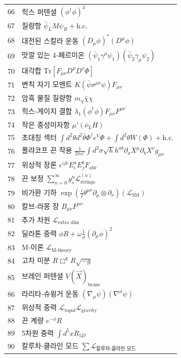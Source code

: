 \documentclass[11pt,a4paper]{article}
\begin{document}
\begin{longtable}{r l}
		66 & 힉스 퍼텐셜 $(\phi^\dagger\phi)^3$ \\
		67 & 질량항 $\bar{\psi}_L M \psi_R + \text{h.c.}$ \\
		68 & 대전된 스칼라 운동 $(D_\mu\phi)^*(D^\mu\phi)$ \\
		69 & 맛깔 있는 4‑페르미온 $(\bar{\psi}_1\gamma^\mu\psi_1)(\bar{\psi}_2\gamma_\mu\psi_2)$ \\
		70 & 대각합 $\mathrm{Tr}[F_{\mu\nu}D^\mu D^\nu\Phi]$ \\
		71 & 변칙 자기 모멘트 $K(\bar{\psi}\sigma^{\mu\nu}\psi)F_{\mu\nu}$ \\
		72 & 암흑 물질 질량항 $m_\chi\bar{\chi}\chi$ \\
		73 & 힉스‑게이지 결합 $\lambda_1(\phi^\dagger\phi)F_{\mu\nu}F^{\mu\nu}$ \\
		74 & 작은 중성미자항 $\mu'(\bar{\nu}_L H)$ \\
		75 & 초대칭 섹터 $\int d^2\theta d^2\bar{\theta}\Phi^\dagger e^V\Phi + \int d^2\theta W(\Phi) + \text{h.c.}$ \\
		76 & 폴랴코프 끈 작용 $\frac{1}{2\pi\alpha'}\int d^2\sigma\sqrt{h}h^{ab}\partial_a X^\mu\partial_b X^\nu g_{\mu\nu}$ \\
		77 & 위상적 장론 $\epsilon^{ijk}E_i^a E_j^b F_{ab k}$ \\
		78 & 끈 보정 $\sum_{n=0}^\infty g_s^n \mathcal{L}^{(n)}_{\text{strings}}$ \\
		79 & 비가환 기하 $\exp\left(\frac{i}{2}\theta^{\mu\nu}\partial_\mu\otimes\partial_\nu\right)(\mathcal{L}_{\text{SM}})$ \\
		80 & 칼브‑라몽 장 $B_{\mu\nu}F^{\mu\nu}$ \\
		81 & 추가 차원 $\mathcal{L}_{\text{extra dim}}$ \\
		82 & 딜라톤 중력 $\phi R + \omega\frac{1}{\phi}(\partial_\mu\phi)^2$ \\
		83 & M‑이론 $\mathcal{L}_{\text{M‑theory}}$ \\
		84 & 고차 미분 $R\Box^k R\sqrt{-g}$ \\
		85 & 브레인 퍼텐셜 $V(\vec{X})_{\text{brane}}$ \\
		86 & 라리타‑슈윙거 운동 $(\nabla_\mu\psi)(\nabla^\mu\psi)$ \\
		87 & 위상적 중력 $\mathcal{L}_{\text{topol}}\mathcal{L}_{\text{gravity}}$ \\
		88 & 끈 계량 $e^{-\phi}R$ \\
		89 & 5차원 중력 $\int d^5x R_{5D}$ \\
		90 & 칼루차‑클라인 모드 $\sum\mathcal{L}_{\text{칼루차‑클라인 모드}}$ \\

\end{longtable}
\end{document}
